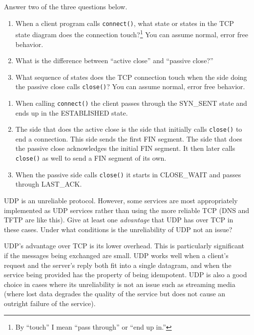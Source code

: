 \documentclass[12pt]{examdesign}
\begin{document}
\begin{shortanswer}

  \begin{question}
  	Answer two of the three questions below.
    \begin{enumerate}
    \item When a client program calls \texttt{connect()}, what state or states in the TCP state
      diagram does the connection touch?\footnote{By ``touch'' I mean ``pass through'' or ``end
        up in.''} You can assume normal, error free behavior.
    \item What is the difference between ``active close'' and ``passive close?''
    \item What sequence of states does the TCP connection touch when the side doing the passive
      close calls \texttt{close()}? You can assume normal, error free behavior.
    \end{enumerate}
    
    \begin{answer}
    \begin{enumerate}
    
    \item When calling \texttt{connect()} the client passes through the SYN\_SENT state and ends
      up in the ESTABLISHED state.
    \item The side that does the active close is the side that initially calls \texttt{close()}
      to end a connection. This side sends the first FIN segment. The side that does the passive
      close acknowledges the initial FIN segment. It then later calls \texttt{close()} as well
      to send a FIN segment of its own.
    \item When the passive side calls \texttt{close()} it starts in CLOSE\_WAIT and passes
    through LAST\_ACK.
    \end{enumerate}
    \end{answer}
  \end{question}


  \begin{question}
    UDP is an unreliable protocol. However, some services are most appropriately implemented as
    UDP services rather than using the more reliable TCP (DNS and TFTP are like this). Give at
    least one \emph{advantage} that UDP has over TCP in these cases. Under what conditions is
    the unreliability of UDP not an issue?

    \begin{answer}
      UDP's advantage over TCP is its lower overhead. This is particularly significant if the
      messages being exchanged are small. UDP works well when a client's request and the
      server's reply both fit into a single datagram, and when the service being provided has
      the property of being idempotent. UDP is also a good choice in cases where its
      unreliability is not an issue such as streaming media (where lost data degrades the
      quality of the service but does not cause an outright failure of the service).
    \end{answer}
  \end{question}


\end{shortanswer}
\end{document}
